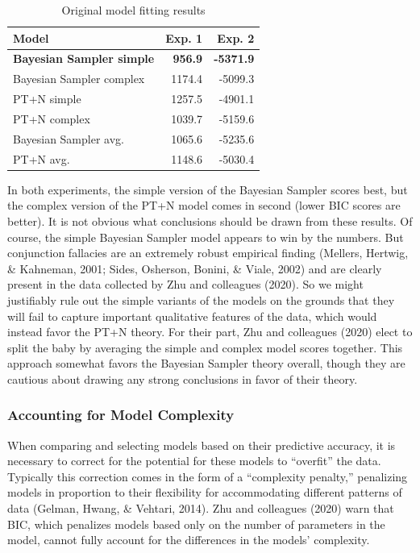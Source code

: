 \documentclass[
  english,
  man,floatsintext]{apa6}
\begin{document}
\begin{table}

\caption{\label{tab:table1}Original model fitting results}
\centering
\begin{tabular}[t]{lrr}
\toprule
Model & Exp. 1 & Exp. 2\\
\midrule
\textbf{Bayesian Sampler simple} & \textbf{956.9} & \textbf{-5371.9}\\
Bayesian Sampler complex & 1174.4 & -5099.3\\
PT+N simple & 1257.5 & -4901.1\\
PT+N complex & 1039.7 & -5159.6\\
Bayesian Sampler avg. & 1065.6 & -5235.6\\
\addlinespace
PT+N avg. & 1148.6 & -5030.4\\
\bottomrule
\end{tabular}
\end{table}

In both experiments, the simple version of the Bayesian Sampler scores best, but the complex version of the PT+N model comes in second (lower BIC scores are better). It is not obvious what conclusions should be drawn from these results. Of course, the simple Bayesian Sampler model appears to win by the numbers. But conjunction fallacies are an extremely robust empirical finding (Mellers, Hertwig, \& Kahneman, 2001; Sides, Osherson, Bonini, \& Viale, 2002) and are clearly present in the data collected by Zhu and colleagues (2020). So we might justifiably rule out the simple variants of the models on the grounds that they will fail to capture important qualitative features of the data, which would instead favor the PT+N theory. For their part, Zhu and colleagues (2020) elect to split the baby by averaging the simple and complex model scores together. This approach somewhat favors the Bayesian Sampler theory overall, though they are cautious about drawing any strong conclusions in favor of their theory.

\hypertarget{accounting-for-model-complexity}{%
\subsubsection{Accounting for Model Complexity}\label{accounting-for-model-complexity}}

When comparing and selecting models based on their predictive accuracy, it is necessary to correct for the potential for these models to ``overfit'' the data. Typically this correction comes in the form of a ``complexity penalty,'' penalizing models in proportion to their flexibility for accommodating different patterns of data (Gelman, Hwang, \& Vehtari, 2014). Zhu and colleagues (2020) warn that BIC, which penalizes models based only on the number of parameters in the model, cannot fully account for the differences in the models' complexity.
\end{document}
